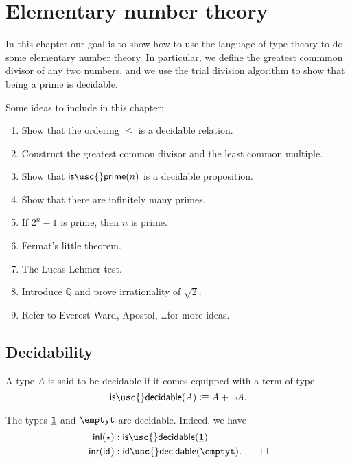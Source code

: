 \chapter{Elementary number theory}

In this chapter our goal is to show how to use the language of type theory to do some elementary number theory. In particular, we define the greatest commmon divisor of any two numbers, and we use the trial division algorithm to show that being a prime is decidable.

Some ideas to include in this chapter:
\begin{enumerate}
\item Show that the ordering $\leq$ is a decidable relation.
\item Construct the greatest common divisor and the least common multiple.
\item Show that $\mathsf{is\usc{}prime}(n)$ is a decidable proposition.
\item Show that there are infinitely many primes.
\item If $2^n-1$ is prime, then $n$ is prime.
\item Fermat's little theorem.
\item The Lucas-Lehmer test.
\item Introduce $\mathbb{Q}$ and prove irrationality of $\sqrt{2}$.
\item Refer to Everest-Ward, Apostol, \dots for more ideas.
\end{enumerate}


\section{Decidability}

\begin{defn}
  A type $A$ is said to be decidable if it comes equipped with a term of type
  \begin{equation*}
    \mathsf{is\usc{}decidable}(A)\defeq A+\neg A.
  \end{equation*}
\end{defn}

\begin{eg}
  The types $\underline{\mathbf{1}}$ and $\emptyt$ are decidable. Indeed, we have
  \begin{align*}
    \inl(\ttt) & :\mathsf{is\usc{}decidable}(\unit) \\
    \inr(\idfunc) & : \mathsf{id\usc{}decidable}(\emptyt).\qedhere
  \end{align*}
\end{eg}

